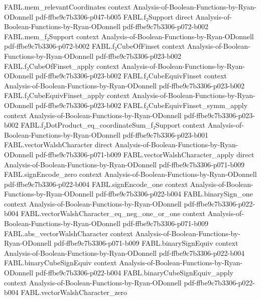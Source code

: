 \begin{theorem}
\proofstep
  {FABL.mem_relevantCoordinates}
  {context}
  {Analysis-of-Boolean-Functions-by-Ryan-ODonnell}
  {pdf-ffbe9c7b3306-p047-b005}
\proofstep
  {FABL.f₂Support}
  {direct}
  {Analysis-of-Boolean-Functions-by-Ryan-ODonnell}
  {pdf-ffbe9c7b3306-p072-b002}
\proofstep
  {FABL.mem_f₂Support}
  {context}
  {Analysis-of-Boolean-Functions-by-Ryan-ODonnell}
  {pdf-ffbe9c7b3306-p072-b002}
\proofstep
  {FABL.f₂CubeOfFinset}
  {context}
  {Analysis-of-Boolean-Functions-by-Ryan-ODonnell}
  {pdf-ffbe9c7b3306-p023-b002}
\proofstep
  {FABL.f₂CubeOfFinset_apply}
  {context}
  {Analysis-of-Boolean-Functions-by-Ryan-ODonnell}
  {pdf-ffbe9c7b3306-p023-b002}
\proofstep
  {FABL.f₂CubeEquivFinset}
  {context}
  {Analysis-of-Boolean-Functions-by-Ryan-ODonnell}
  {pdf-ffbe9c7b3306-p023-b002}
\proofstep
  {FABL.f₂CubeEquivFinset_apply}
  {context}
  {Analysis-of-Boolean-Functions-by-Ryan-ODonnell}
  {pdf-ffbe9c7b3306-p023-b002}
\proofstep
  {FABL.f₂CubeEquivFinset_symm_apply}
  {context}
  {Analysis-of-Boolean-Functions-by-Ryan-ODonnell}
  {pdf-ffbe9c7b3306-p023-b002}
\proofstep
  {FABL.f₂DotProduct_eq_coordinateSum_f₂Support}
  {context}
  {Analysis-of-Boolean-Functions-by-Ryan-ODonnell}
  {pdf-ffbe9c7b3306-p023-b001}
\proofstep
  {FABL.vectorWalshCharacter}
  {direct}
  {Analysis-of-Boolean-Functions-by-Ryan-ODonnell}
  {pdf-ffbe9c7b3306-p071-b009}
\proofstep
  {FABL.vectorWalshCharacter_apply}
  {direct}
  {Analysis-of-Boolean-Functions-by-Ryan-ODonnell}
  {pdf-ffbe9c7b3306-p071-b009}
\proofstep
  {FABL.signEncode_zero}
  {context}
  {Analysis-of-Boolean-Functions-by-Ryan-ODonnell}
  {pdf-ffbe9c7b3306-p022-b004}
\proofstep
  {FABL.signEncode_one}
  {context}
  {Analysis-of-Boolean-Functions-by-Ryan-ODonnell}
  {pdf-ffbe9c7b3306-p022-b004}
\proofstep
  {FABL.binarySign_one}
  {context}
  {Analysis-of-Boolean-Functions-by-Ryan-ODonnell}
  {pdf-ffbe9c7b3306-p022-b004}
\proofstep
  {FABL.vectorWalshCharacter_eq_neg_one_or_one}
  {context}
  {Analysis-of-Boolean-Functions-by-Ryan-ODonnell}
  {pdf-ffbe9c7b3306-p071-b009}
\proofstep
  {FABL.abs_vectorWalshCharacter}
  {context}
  {Analysis-of-Boolean-Functions-by-Ryan-ODonnell}
  {pdf-ffbe9c7b3306-p071-b009}
\proofstep
  {FABL.binarySignEquiv}
  {context}
  {Analysis-of-Boolean-Functions-by-Ryan-ODonnell}
  {pdf-ffbe9c7b3306-p022-b004}
\proofstep
  {FABL.binaryCubeSignEquiv}
  {context}
  {Analysis-of-Boolean-Functions-by-Ryan-ODonnell}
  {pdf-ffbe9c7b3306-p022-b004}
\proofstep
  {FABL.binaryCubeSignEquiv_apply}
  {context}
  {Analysis-of-Boolean-Functions-by-Ryan-ODonnell}
  {pdf-ffbe9c7b3306-p022-b004}
\proofstep
  {FABL.vectorWalshCharacter_zero}

\end{theorem}
